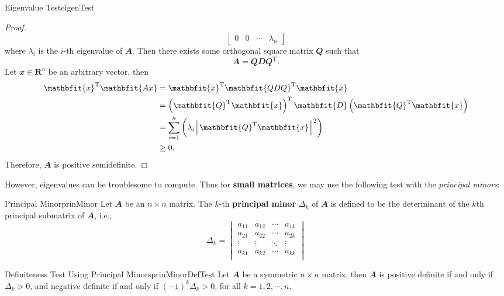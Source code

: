 \documentclass[math, code]{amznotes}
\theoremstyle{remark}
\begin{document}
\begin{thmbox}{Eigenvalue Test}{eigenTest}
\begin{proof}
\begin{displaymath}
\begin{bmatrix}
                0 & 0 & \cdots & \lambda_n
            \end{bmatrix}
        \end{displaymath}
        where $\lambda_i$ is the $i$-th eigenvalue of $\mathbfit{A}$. Then there exists some orthogonal square matrix $\mathbfit{Q}$ such that 
        \begin{equation*}
            \mathbfit{A} = \mathbfit{QDQ}^{\mathrm{T}}.
        \end{equation*}
        Let $\mathbfit{x} \in \mathbf{R}^n$ be an arbitrary vector, then 
        \begin{align*}
            \mathbfit{x}^{\mathrm{T}}\mathbfit{Ax} & = \mathbfit{x}^{\mathrm{T}}\mathbfit{QDQ}^{\mathrm{T}}\mathbfit{x} \\
            & = \left(\mathbfit{Q}^{\mathrm{T}}\mathbfit{x}\right)^{\mathrm{T}}\mathbfit{D}\left(\mathbfit{Q}^{\mathrm{T}}\mathbfit{x}\right) \\
            & = \sum_{i = 1}^{n}\left(\lambda_i\norm{\mathbfit{Q}^{\mathrm{T}}\mathbfit{x}}^2\right) \\
            & \geq 0.
        \end{align*}
        Therefore, $\mathbfit{A}$ is positive semidefinite.
    \end{proof}
\end{thmbox}
However, eigenvalues can be troublesome to compute. Thus for \textbf{small matrices}, we may use the following test with the \textit{principal minors}:
\begin{dfnbox}{Principal Minor}{prinMinor}
    Let $\mathbfit{A}$ be an $n \times n$ matrix. The $k$-th {\color{red} \textbf{principal minor}} $\Delta_k$ of $\mathbfit{A}$ is defined to be the determinant of the $k$th principal submatrix of $\mathbfit{A}$, i.e.,
    \begin{equation*}
        \Delta_k = \begin{vmatrix}
            a_{11} & a_{12} & \cdots & a_{1k} \\
            a_{21} & a_{22} & \cdots & a_{2k} \\
            \vdots & \vdots & \ddots & \vdots \\
            a_{k1} & a_{k2} & \cdots & a_{kk} \\
        \end{vmatrix}
    \end{equation*}
\end{dfnbox}
\begin{thmbox}{Definiteness Test Using Principal Minors}{prinMinorDefTest}
    Let $\mathbfit{A}$ be a symmetric $n \times n$ matrix, then $\mathbfit{A}$ is positive definite if and only if $\Delta_k > 0$, and negative definite if and only if $(-1)^k\Delta_k > 0$, for all $k = 1, 2, \cdots, n$.
\end{thmbox}
\end{document}
